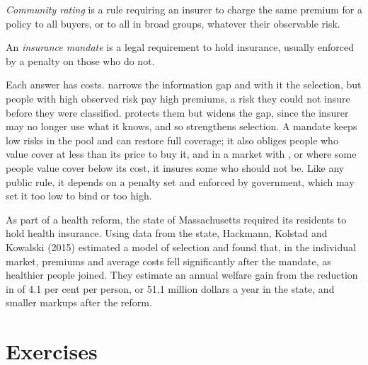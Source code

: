 \begin{definition}\label{def:b2:adverse-selection:community-rating}
\emph{Community rating} is a rule requiring an insurer to charge the same premium for a
policy to all buyers, or to all in broad groups, whatever their observable risk.
\end{definition}

\begin{definition}\label{def:b2:adverse-selection:mandate}
An \emph{insurance mandate} is a legal requirement to hold insurance, usually enforced by a
penalty on those who do not.
\end{definition}

Each answer has costs.  narrows the information gap and with it the selection, but people with high
observed risk pay high premiums, a risk they could not insure before they were classified.  protects them
but widens the gap, since the insurer may no longer use what it knows, and so strengthens selection. A mandate keeps low
risks in the pool and can restore full coverage; it also obliges people who value cover at less than its price to buy it,
and in a market with , or where some people value cover below its cost, it insures some who
should not be. Like any public rule, it depends on a penalty set and enforced by government, which may set it too low to
bind or too high.

\begin{record}
As part of a health reform, the state of Massachusetts required its residents to hold health insurance. Using data from the state, Hackmann, Kolstad and Kowalski (2015) estimated a model of selection and found that, in the
individual market, premiums and average costs fell significantly after the mandate, as healthier people joined. They
estimate an annual welfare gain from the reduction in  of 4.1 per cent per person, or 51.1 million dollars
a year in the state, and smaller markups after the reform.
\end{record}

\section{Exercises}\label{sec:b2:adverse-selection:exercises}

